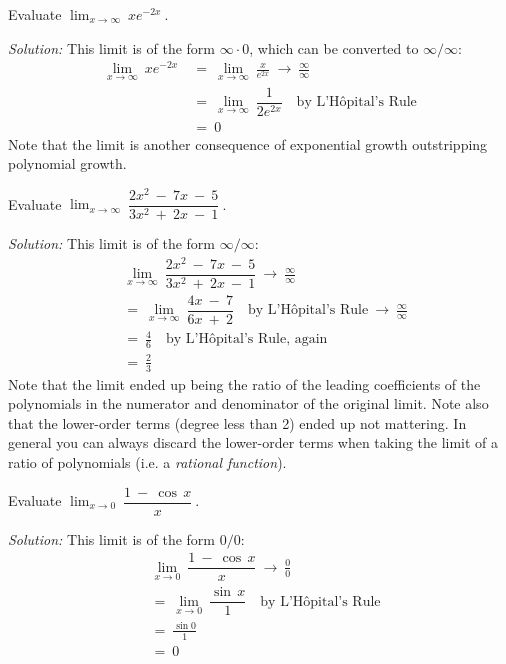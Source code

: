 \begin{exmp}\label{exmp:limzeroinf}
\noindent Evaluate $\displaystyle\lim_{x \to \infty}~x e^{-2x}~$.\vspace{1mm}
\par\noindent\emph{Solution:} This limit is of the form $\infty \cdot 0$, which
can be converted to $\infty/\infty$:
\begin{align*}
\lim_{x \to \infty}~x e^{-2x} ~&=~ \lim_{x \to \infty}~\frac{x}{e^{2x}} ~\to~ \frac{\infty}{\infty}\\
&=~ \lim_{x \to \infty}~\dfrac{1}{2e^{2x}} \quad\text{by L'H\^{o}pital's Rule}\\
&=~ 0
\end{align*}
Note that the limit is another consequence of exponential growth outstripping
polynomial growth.
\end{exmp}
\begin{exmp}\label{exmp:limratpoly}
\noindent Evaluate $\displaystyle\lim_{x \to \infty}~\dfrac{2x^2 ~-~ 7x ~-~ 5}{3x^2 ~+~ 2x ~-~ 1}~$.\vspace{1mm}
\par\noindent\emph{Solution:} This limit is of the form $\infty/\infty$:
\begin{align*}
&\lim_{x \to \infty}~\dfrac{2x^2 ~-~ 7x ~-~ 5}{3x^2 ~+~ 2x ~-~ 1} ~\to~ \frac{\infty}{\infty}\\[4pt]
&=~ \lim_{x \to \infty}~\dfrac{4x ~-~ 7}{6x ~+~ 2} \quad\text{by L'H\^{o}pital's Rule}
~\to~ \frac{\infty}{\infty} \\[6pt]
&=~ \frac{4}{6} \quad\text{by L'H\^{o}pital's Rule, again}\\
&=~ \frac{2}{3}
\end{align*}
Note that the limit ended up being the ratio of the leading coefficients of the
polynomials in the numerator and denominator of the original limit. Note also
that the lower-order terms (degree less than 2) ended up not mattering. In
general you can always discard the lower-order terms when taking the limit of a
ratio of polynomials (i.e. a
\emph{rational function}).
\end{exmp}
\divider
\newpage
\begin{exmp}\label{exmp:lim1minuscos}
\noindent Evaluate $\displaystyle\lim_{x \to 0}~\dfrac{1 ~-~ \cos\,x}{x}~$.\vspace{1mm}
\par\noindent\emph{Solution:} This limit is of the form $0/0$:
\begin{align*}
&\lim_{x \to 0}~\dfrac{1 ~-~ \cos\,x}{x} ~\to~ \frac{0}{0}\\[4pt]
&=~ \lim_{x \to 0}~\dfrac{\sin\,x}{1} \quad\text{by L'H\^{o}pital's Rule}\\[6pt]
&=~ \frac{\sin 0}{1}\\
&=~ 0
\end{align*}
\end{exmp}
\divider
\vspace{3mm}

